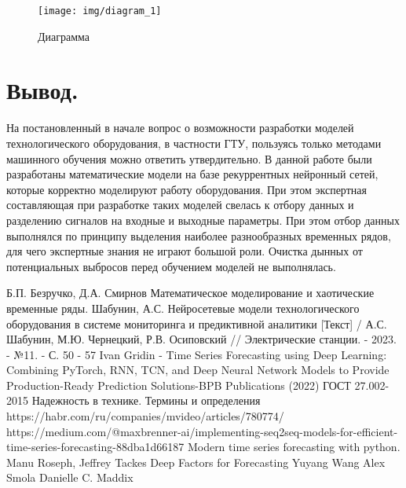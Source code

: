 \documentclass[12pt,a4paper]{article}
\begin{document}
\begin{figure}[htbp]
	\centering\texttt{[image: img/diagram\_1]}
	\caption{Диаграмма}
	\label{fig:diagram_1}
\end{figure}




\newpage
\section{Вывод.}

На постановленный в начале вопрос о возможности разработки моделей технологического оборудования, в частности ГТУ, пользуясь только методами машинного обучения можно ответить утвердительно. В данной работе были разработаны математические модели на базе рекуррентных нейронный сетей, которые корректно моделируют работу оборудования. При этом экспертная составляющая при разработке таких моделей свелась к отбору данных и разделению сигналов на входные и выходные параметры. При этом отбор данных выполнялся по принципу выделения наиболее разнообразных временных рядов, для чего экспертные знания не играют большой роли. Очистка дынных от потенциальных выбросов перед обучением моделей не выполнялась.




%

\newpage
\begin{thebibliography}{}
	 Б.П. Безручко, Д.А. Смирнов Математическое моделирование и хаотические временные ряды.
	 Шабунин, А.С. Нейросетевые модели технологического оборудования в системе мониторинга и предиктивной аналитики [Текст] / А.С. Шабунин, М.Ю. Чернецкий, Р.В. Осиповский // Электрические станции. - 2023. - №11. - С. 50 - 57
	 Ivan Gridin - Time Series Forecasting using Deep Learning: Combining PyTorch, RNN, TCN, and Deep Neural Network Models to Provide Production-Ready Prediction Solutions-BPB Publications (2022)
	 ГОСТ 27.002-2015 Надежность в технике. Термины и определения
	 https://habr.com/ru/companies/mvideo/articles/780774/
	 https://medium.com/@maxbrenner-ai/implementing-seq2seq-models-for-efficient-time-series-forecasting-88dba1d66187
	 Modern time series forecasting with python. Manu Roseph, Jeffrey Tackes
	 Deep Factors for Forecasting Yuyang Wang Alex Smola Danielle C. Maddix 
\end{thebibliography}
\end{document}
